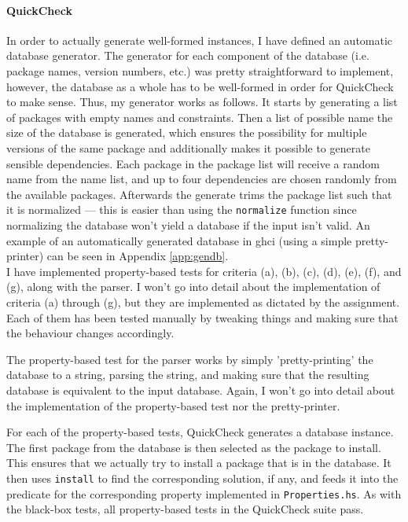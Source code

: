 \paragraph{QuickCheck}
In order to actually generate well-formed instances, I have defined an automatic database generator. The generator for each component of the database (i.e. package names, version numbers, etc.) was pretty straightforward to implement, however, the database as a whole has to be well-formed in order for QuickCheck to make sense. Thus, my generator works as follows. It starts by generating a list of packages with empty names and constraints. Then a list of possible name the size of the database is generated, which ensures the possibility for multiple versions of the same package and additionally makes it possible to generate sensible dependencies. Each package in the package list will receive a random name from the name list, and up to four dependencies are chosen randomly from the available packages. Afterwards the generate trims the package list such that it is normalized --- this is easier than using the \texttt{normalize} function since normalizing the database won't yield a database if the input isn't valid. An example of an automatically generated database in ghci (using a simple pretty-printer) can be seen in Appendix \ref{app:gendb}. \\

\noindent I have implemented property-based tests for criteria (a), (b), (c), (d), (e), (f), and (g), along with the parser. I won't go into detail about the implementation of criteria (a) through (g), but they are implemented as dictated by the assignment. Each of them has been tested manually by tweaking things and making sure that the behaviour changes accordingly.

The property-based test for the parser works by simply 'pretty-printing' the database to a string, parsing the string, and making sure that the resulting database is equivalent to the input database. Again, I won't go into detail about the implementation of the property-based test nor the pretty-printer.

For each of the property-based tests, QuickCheck generates a database instance. The first package from the database is then selected as the package to install. This ensures that we actually try to install a package that is in the database. It then uses \texttt{install} to find the corresponding solution, if any, and feeds it into the predicate for the corresponding property implemented in \texttt{Properties.hs}. As with the black-box tests, all property-based tests in the QuickCheck suite pass.


